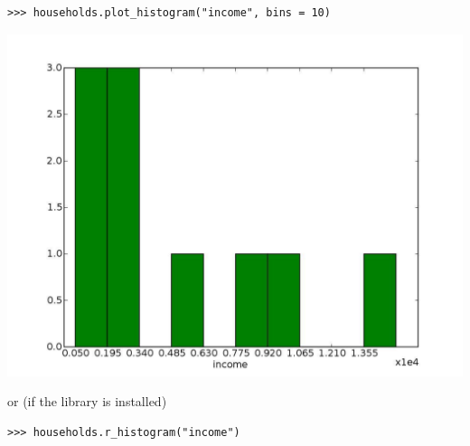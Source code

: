 \begin{verbatim}
>>> households.plot_histogram("income", bins = 10)
\end{verbatim}
\begin{center}
\includegraphics[scale=0.2, angle=0]{images/incomehist.pdf}
\end{center}
or (if the  library is installed)
\begin{verbatim}
>>> households.r_histogram("income")
\end{verbatim}

